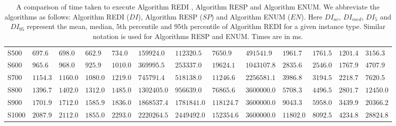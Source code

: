 \begin{table}[]
{\begin{tabular}{ R{1.2cm} | R{1.4cm} R{1.4cm} R{1.4cm} R{1.4cm} | R{1.8cm} R{1.8cm} R{1.8cm} R{1.8cm} | R{1.4cm} R{1.4cm} R{1.4cm} R{1.4cm} }
 S500 & $697.6$ & $698.0$ & $662.9$ & $734.0$ & $159924.0$ & $112320.5$ & $7650.9$ & $491541.9$ & $1961.7$ & $1761.5$ & $1201.4$ & $3156.3$ \\ 
 S600 & $965.6$ & $968.0$ & $925.9$ & $1010.0$ & $369995.5$ & $253337.0$ & $19624.1$ & $1043107.8$ & $2835.6$ & $2546.0$ & $1767.9$ & $4707.9$ \\ 
 S700 & $1154.3$ & $1160.0$ & $1080.0$ & $1219.0$ & $745791.4$ & $518138.0$ & $11246.6$ & $2256581.1$ & $3986.8$ & $3194.5$ & $2218.7$ & $7620.5$ \\ 
 S800 & $1396.7$ & $1402.0$ & $1312.0$ & $1485.0$ & $1302405.0$ & $956639.0$ & $76865.6$ & $3600000.0$ & $5708.3$ & $4496.5$ & $2801.7$ & $12450.0$ \\ 
 S900 & $1701.9$ & $1712.0$ & $1585.9$ & $1836.0$ & $1868537.4$ & $1781841.0$ & $118124.7$ & $3600000.0$ & $9043.3$ & $5958.0$ & $3439.9$ & $20366.2$ \\ 
 S1000 & $2087.9$ & $2112.0$ & $1855.0$ & $2293.0$ & $2220264.5$ & $2449492.0$ & $152354.6$ & $3600000.0$ & $11802.0$ & $8092.5$ & $4234.8$ & $28824.8$ \\ 
 \hline\hline \end{tabular}} \caption{A comparison of time taken to execute Algorithm REDI              , Algorithm RESP and Algorithm ENUM. We              abbreviate the algorithms as follows: Algorithm REDI ($DI$), Algorithm RESP ($SP$) and              Algorithm ENUM ($EN$). Here $DI_{av}$, $DI_{med}$, $DI_{5}$ and $DI_{95}$ represent the mean,              median, $5$th percentile and $95$th percentile of Algorithm REDI for a given instance type.              Similar notation is used for Algorithms RESP and ENUM. Times are in ms.} \label{sm_re_table_duration} \end{table} 